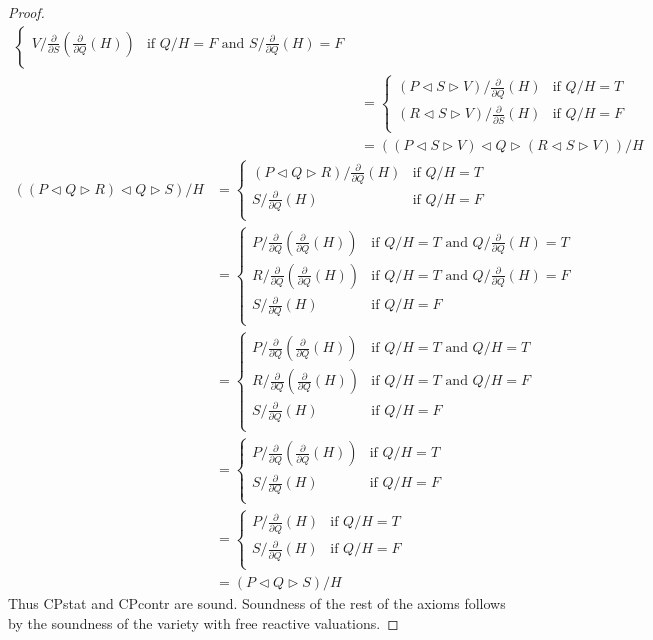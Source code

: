\documentclass[a4paper,twoside,openright]{report}
\newcommand{\dd}[1]{\frac{\partial}{\partial #1}}
\newcommand{\lef}{\ensuremath{\triangleleft}}
\newcommand{\rig}{\ensuremath{\triangleright}}
\begin{document}
\begin{proof}
\begin{align*}
\begin{cases}
V/\dd S(\dd Q(H)) & \text{if $Q/H=F$ and $S/\dd Q(H)=F$}\\
\end{cases}\\
&=\begin{cases}
(P\lef S\rig V)/\dd Q(H) & \text{if $Q/H=T$}\\
(R\lef S\rig V)/\dd S(H) & \text{if $Q/H=F$}\\
\end{cases}\\
&=((P\lef S\rig V)\lef Q\rig(R\lef S\rig V))/H
\end{align*}
\begin{align*}
((P\lef Q\rig R)\lef Q\rig S)/H
&=\begin{cases}
(P\lef Q\rig R)/\dd Q(H) & \text{if $Q/H=T$}\\
S/\dd Q(H) & \text{if $Q/H=F$}\\
\end{cases}\\
&=\begin{cases}
P/\dd Q(\dd Q(H)) & \text{if $Q/H=T$ and $Q/\dd Q(H)=T$}\\
R/\dd Q(\dd Q(H)) & \text{if $Q/H=T$ and $Q/\dd Q(H)=F$}\\
S/\dd Q(H) & \text{if $Q/H=F$}\\
\end{cases}\\
&=\begin{cases}
P/\dd Q(\dd Q(H)) & \text{if $Q/H=T$ and $Q/H=T$}\\
R/\dd Q(\dd Q(H)) & \text{if $Q/H=T$ and $Q/H=F$}\\
S/\dd Q(H) & \text{if $Q/H=F$}\\
\end{cases}\\
&=\begin{cases}
P/\dd Q(\dd Q(H)) & \text{if $Q/H=T$}\\
S/\dd Q(H) & \text{if $Q/H=F$}\\
\end{cases}\\
&=\begin{cases}
P/\dd Q(H) & \text{if $Q/H=T$}\\
S/\dd Q(H) & \text{if $Q/H=F$}\\
\end{cases}\\
&= (P\lef Q\rig S)/H
\end{align*}
Thus CPstat and CPcontr are sound. Soundness of the rest of the axioms follows by the soundness of the variety with free reactive valuations.
\end{proof}
\end{document}
